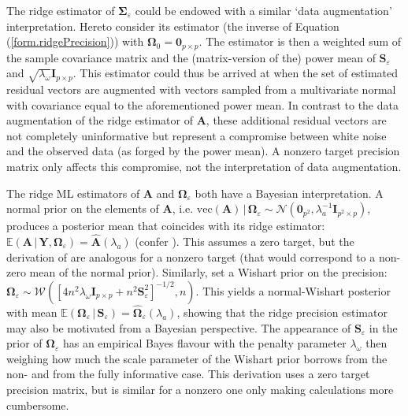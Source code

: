 The ridge estimator of $\mathbf{\Sigma}_{\varepsilon}$ could be endowed with a similar `data augmentation' interpretation. Hereto consider its estimator (the inverse of Equation (\ref{form.ridgePrecision})) with $\mathbf{\Omega}_0 = \mathbf{0}_{p \times p}$. The estimator is then a weighted sum of the sample covariance matrix and the (matrix-version of the) power mean of $\mathbf{S}_{\varepsilon}$ and $\sqrt{\lambda_{\omega}} \mathbf{I}_{p \times p}$. This estimator could thus be arrived at when the set of estimated residual vectors are augmented with vectors sampled from a multivariate normal with covariance equal to the aforementioned power mean. In contrast to the data augmentation of the ridge estimator of $\mathbf{A}$, these additional residual vectors are not completely uninformative but represent a compromise between white noise and the observed data (as forged by the power mean). A nonzero target precision matrix only affects this compromise, not the interpretation of data augmentation.

The ridge ML estimators of $\mathbf{A}$ and $\mathbf{\Omega}_{\varepsilon}$ both have a Bayesian interpretation. A normal prior on the elements of $\mathbf{A}$, i.e. $\mbox{vec}(\mathbf{A}) \, | \, \mathbf{\Omega}_{\varepsilon} \sim \mathcal{N}( \mathbf{0}_{p^2}, \lambda_a^{-1} \mathbf{I}_{p^2 \times p})$, produces a posterior mean that coincides with its ridge estimator: $\mathbb{E} ( \mathbf{A} \, | \, \mathbf{Y}, \mathbf{\Omega}_{\varepsilon}) =  \hat{\mathbf{A}}(\lambda_a)$ (confer \cite{Lutkepohl2005}). This assumes a zero target, but the derivation of \cite{Lutkepohl2005} are analogous for a nonzero target (that would correspond to a non-zero mean of the normal prior). Similarly, set a Wishart prior on the precision: $\mathbf{\Omega}_{\varepsilon} \sim \mathcal{W}([ 4 n^2 \lambda_{\omega} \mathbf{I}_{p \times p} + n^2 \mathbf{S}_{\varepsilon}^2 ]^{-1/2}, n)$. This yields a normal-Wishart posterior with mean $\mathbb{E} (\mathbf{\Omega}_{\varepsilon} \, | \, \mathbf{S}_{\varepsilon}) = \widehat{\mathbf{\Omega}}_{\varepsilon}(\lambda_a)$, showing that the ridge precision estimator may also be motivated from a Bayesian perspective. The appearance of $\mathbf{S}_{\varepsilon}$ in the prior of $\mathbf{\Omega}_{\varepsilon}$ has an empirical Bayes flavour with the penalty parameter $\lambda_{\omega}$ then weighing how much the scale parameter of the Wishart prior borrows from the non- and from the fully informative case. This derivation uses a zero target precision matrix, but is similar for a nonzero one only making calculations more cumbersome.

